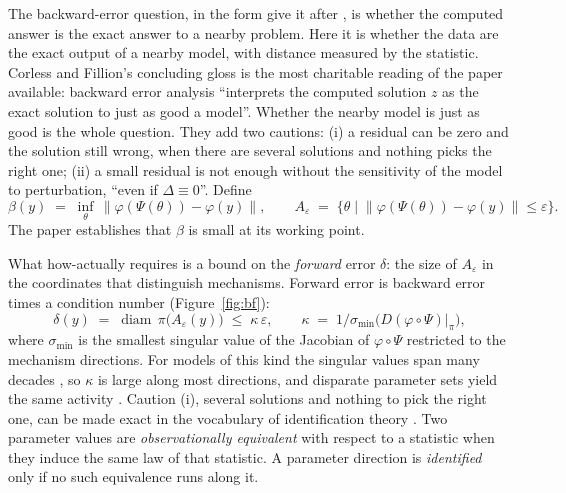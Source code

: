 \documentclass[11pt]{article}
\begin{document}
The backward-error question, in the form \textcite{corless2016} give it after \textcite{wilkinson1963}, is whether the computed answer is the exact answer to a nearby problem. Here it is whether the data are the exact output of a nearby model, with distance measured by the statistic. Corless and Fillion's concluding gloss is the most charitable reading of the paper available: backward error analysis ``interprets the computed solution $z$ as the exact solution to just as good a model''. Whether the nearby model is just as good is the whole question. They add two cautions: (i) a residual can be zero and the solution still wrong, when there are several solutions and nothing picks the right one; (ii) a small residual is not enough without the sensitivity of the model to perturbation, ``even if $\Delta\equiv 0$''. Define
\begin{equation}
\beta(y)\;=\;\inf_{\theta}\,\bigl\|\varphi(\Psi(\theta))-\varphi(y)\bigr\|,
\qquad
A_{\varepsilon}\;=\;\bigl\{\theta \;\big|\; \|\varphi(\Psi(\theta))-\varphi(y)\|\le\varepsilon\bigr\}.
\label{eq:beta}
\end{equation}
The paper establishes that $\beta$ is small at its working point.

What how-actually requires is a bound on the \emph{forward} error $\delta$: the size of $A_\varepsilon$ in the coordinates that distinguish mechanisms. Forward error is backward error times a condition number \parencite{higham2002,corless2016} (Figure~\ref{fig:bf}):
\begin{equation}
\delta(y)\;=\;\operatorname{diam}\,\pi\bigl(A_{\varepsilon}(y)\bigr)\;\le\;\kappa\,\varepsilon,
\qquad
\kappa \;=\; 1\big/\sigma_{\min}\!\bigl(D(\varphi\circ\Psi)\big|_{\pi}\bigr),
\label{eq:forward}
\end{equation}
where $\sigma_{\min}$ is the smallest singular value of the Jacobian of $\varphi\circ\Psi$ restricted to the mechanism directions. For models of this kind the singular values span many decades \parencite{gutenkunst2007,machta2013,transtrum2015}, so $\kappa$ is large along most directions, and disparate parameter sets yield the same activity \parencite{prinz2004}. Caution (i), several solutions and nothing to pick the right one, can be made exact in the vocabulary of identification theory \parencite{rothenberg1971}. Two parameter values are \emph{observationally equivalent} with respect to a statistic when they induce the same law of that statistic. A parameter direction is \emph{identified} only if no such equivalence runs along it.
\end{document}
